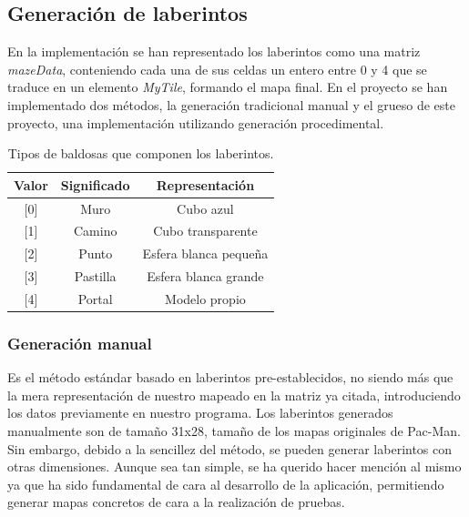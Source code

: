 
\newpage

\subsection{Generación de laberintos}

En la implementación se han representado los laberintos como una matriz \textit{mazeData}, conteniendo cada una de sus celdas un entero entre 0 y 4 que se traduce en un elemento \textit{MyTile}, formando el mapa final. En el proyecto se han implementado dos métodos, la generación tradicional manual y el grueso de este proyecto, una implementación utilizando generación procedimental.

\begin{table}[H]
    \centering
    \caption{Tipos de baldosas que componen los laberintos.}
    \begin{tabular}{|c|c|c|}
    \hline
    Valor   & Significado & Representación        \\ \hline
    {[}0{]} & Muro        & Cubo azul             \\ \hline
    {[}1{]} & Camino      & Cubo transparente     \\ \hline
    {[}2{]} & Punto       & Esfera blanca pequeña \\ \hline
    {[}3{]} & Pastilla    & Esfera blanca grande  \\ \hline
    {[}4{]} & Portal      & Modelo propio            \\ \hline
    \end{tabular}
\end{table}

\subsubsection{Generación manual}

Es el método estándar basado en laberintos pre-establecidos, no siendo más que la mera representación de nuestro mapeado en la matriz ya citada, introduciendo los datos previamente en nuestro programa. Los laberintos generados manualmente son de tamaño 31x28, tamaño de los mapas originales de Pac-Man. Sin embargo, debido a la sencillez del método, se pueden generar laberintos con otras dimensiones. Aunque sea tan simple, se ha querido hacer mención al mismo ya que ha sido fundamental de cara al desarrollo de la aplicación, permitiendo generar mapas concretos de cara a la realización de pruebas.

